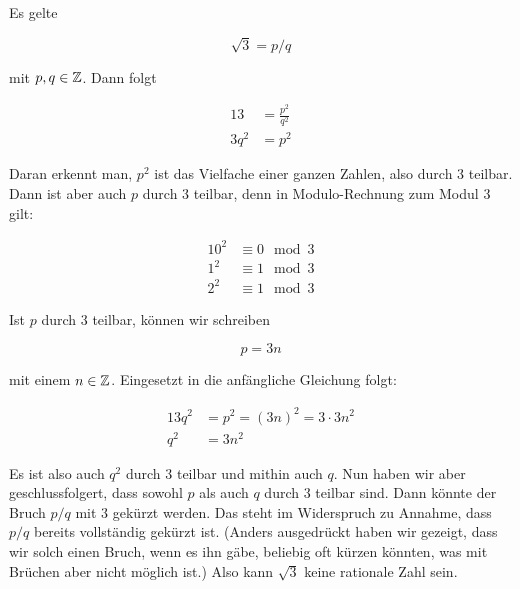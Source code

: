 \item Es gelte

$$
\sqrt{3} = p/q
$$

mit $p,q\in\mathbb{Z}$. Dann folgt

\begin{alignat*}{1}
3 &= \frac{p^2}{q^2} \\
3 q^2 &= p^2
\end{alignat*}

Daran erkennt man, $p^2$ ist das Vielfache einer ganzen Zahlen, also durch $3$ teilbar. Dann ist aber auch $p$ durch 3 teilbar, denn in Modulo-Rechnung zum Modul $3$ gilt:

\begin{alignat*}{1}
0^2 & \equiv 0 \mod 3 \\
1^2 & \equiv 1 \mod 3 \\
2^2 & \equiv 1 \mod 3
\end{alignat*}

Ist $p$ durch $3$ teilbar, können wir schreiben

$$
p = 3 n
$$

mit einem $n \in \mathbb{Z}$. Eingesetzt in die anfängliche Gleichung folgt:

\begin{alignat*}{1}
3 q^2 &= p^2 = (3n)^2 = 3\cdot 3 n^2 \\
  q^2 &= 3 n^2
\end{alignat*}

Es ist also auch $q^2$ durch $3$ teilbar und mithin auch $q$. Nun haben wir aber geschlussfolgert, dass sowohl $p$ als auch $q$ durch $3$ teilbar sind. Dann könnte der Bruch $p/q$ mit $3$ gekürzt werden. Das steht im Widerspruch zu Annahme, dass $p/q$ bereits vollständig gekürzt ist. (Anders ausgedrückt haben wir gezeigt, dass wir solch einen Bruch, wenn es ihn gäbe, beliebig oft kürzen könnten, was mit Brüchen aber nicht möglich ist.) Also kann $\sqrt{3}$ keine rationale Zahl sein.